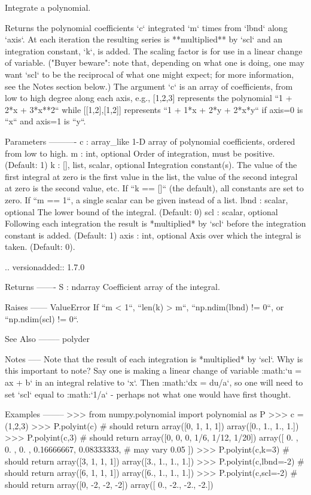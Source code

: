 \begin{DoxyVerb}Integrate a polynomial.

Returns the polynomial coefficients `c` integrated `m` times from
`lbnd` along `axis`.  At each iteration the resulting series is
**multiplied** by `scl` and an integration constant, `k`, is added.
The scaling factor is for use in a linear change of variable.  ("Buyer
beware": note that, depending on what one is doing, one may want `scl`
to be the reciprocal of what one might expect; for more information,
see the Notes section below.) The argument `c` is an array of
coefficients, from low to high degree along each axis, e.g., [1,2,3]
represents the polynomial ``1 + 2*x + 3*x**2`` while [[1,2],[1,2]]
represents ``1 + 1*x + 2*y + 2*x*y`` if axis=0 is ``x`` and axis=1 is
``y``.

Parameters
----------
c : array_like
    1-D array of polynomial coefficients, ordered from low to high.
m : int, optional
    Order of integration, must be positive. (Default: 1)
k : {[], list, scalar}, optional
    Integration constant(s).  The value of the first integral at zero
    is the first value in the list, the value of the second integral
    at zero is the second value, etc.  If ``k == []`` (the default),
    all constants are set to zero.  If ``m == 1``, a single scalar can
    be given instead of a list.
lbnd : scalar, optional
    The lower bound of the integral. (Default: 0)
scl : scalar, optional
    Following each integration the result is *multiplied* by `scl`
    before the integration constant is added. (Default: 1)
axis : int, optional
    Axis over which the integral is taken. (Default: 0).

    .. versionadded:: 1.7.0

Returns
-------
S : ndarray
    Coefficient array of the integral.

Raises
------
ValueError
    If ``m < 1``, ``len(k) > m``, ``np.ndim(lbnd) != 0``, or
    ``np.ndim(scl) != 0``.

See Also
--------
polyder

Notes
-----
Note that the result of each integration is *multiplied* by `scl`.  Why
is this important to note?  Say one is making a linear change of
variable :math:`u = ax + b` in an integral relative to `x`. Then
:math:`dx = du/a`, so one will need to set `scl` equal to
:math:`1/a` - perhaps not what one would have first thought.

Examples
--------
>>> from numpy.polynomial import polynomial as P
>>> c = (1,2,3)
>>> P.polyint(c) # should return array([0, 1, 1, 1])
array([0.,  1.,  1.,  1.])
>>> P.polyint(c,3) # should return array([0, 0, 0, 1/6, 1/12, 1/20])
 array([ 0.        ,  0.        ,  0.        ,  0.16666667,  0.08333333, # may vary
         0.05      ])
>>> P.polyint(c,k=3) # should return array([3, 1, 1, 1])
array([3.,  1.,  1.,  1.])
>>> P.polyint(c,lbnd=-2) # should return array([6, 1, 1, 1])
array([6.,  1.,  1.,  1.])
>>> P.polyint(c,scl=-2) # should return array([0, -2, -2, -2])
array([ 0., -2., -2., -2.])\end{DoxyVerb}
